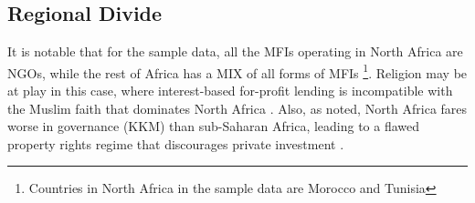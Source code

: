 \documentclass[a4paper,nobind]{templates/ociamthesis}
\begin{document}
\hypertarget{regional-divide}{%
\subsection{Regional Divide}\label{regional-divide}}

It is notable that for the sample data, all the MFIs operating in North Africa are NGOs, while the rest of Africa has a MIX of all forms of MFIs \footnote{Countries in North Africa in the sample data are Morocco and Tunisia}. Religion may be at play in this case, where interest-based for-profit lending is incompatible with the Muslim faith that dominates North Africa \autocite{hassan2018religious}. Also, as noted, North Africa fares worse in governance (KKM) than sub-Saharan Africa, leading to a flawed property rights regime that discourages private investment \autocite{johnson2002property,claessens2003financial}.

\newpage
\end{document}
